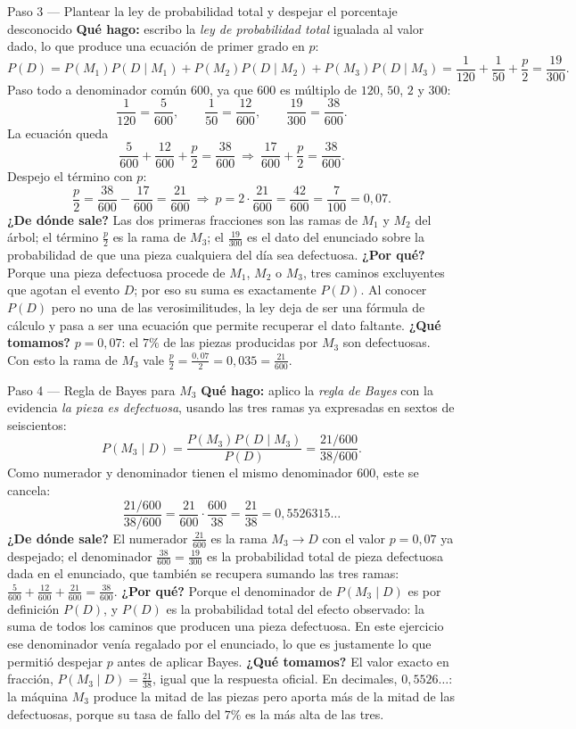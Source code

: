 \documentclass[11pt]{article}
\begin{document}
\begin{sol}
\begin{paso}{Paso 3 --- Plantear la ley de probabilidad total y despejar el porcentaje desconocido}
\textbf{Qué hago:} escribo la \emph{ley de probabilidad total} igualada al valor dado, lo que produce una ecuación de primer grado en $p$:
\[
P(D)=P(M_1)P(D\mid M_1)+P(M_2)P(D\mid M_2)+P(M_3)P(D\mid M_3)
=\frac{1}{120}+\frac{1}{50}+\frac{p}{2}=\frac{19}{300}.
\]
Paso todo a denominador común $600$, ya que $600$ es múltiplo de $120$, $50$, $2$ y $300$:
\[
\frac{1}{120}=\frac{5}{600},\qquad \frac{1}{50}=\frac{12}{600},\qquad \frac{19}{300}=\frac{38}{600}.
\]
La ecuación queda
\[
\frac{5}{600}+\frac{12}{600}+\frac{p}{2}=\frac{38}{600}\ \Longrightarrow\ \frac{17}{600}+\frac{p}{2}=\frac{38}{600}.
\]
Despejo el término con $p$:
\[
\frac{p}{2}=\frac{38}{600}-\frac{17}{600}=\frac{21}{600}\ \Longrightarrow\ p=2\cdot\frac{21}{600}=\frac{42}{600}=\frac{7}{100}=0,07 .
\]
\textbf{¿De dónde sale?} Las dos primeras fracciones son las ramas de $M_1$ y $M_2$ del árbol; el término $\tfrac{p}{2}$ es la rama de $M_3$; el $\tfrac{19}{300}$ es el dato del enunciado sobre la probabilidad de que una pieza cualquiera del día sea defectuosa.
\textbf{¿Por qué?} Porque una pieza defectuosa procede de $M_1$, $M_2$ o $M_3$, tres caminos excluyentes que agotan el evento $D$; por eso su suma es exactamente $P(D)$. Al conocer $P(D)$ pero no una de las verosimilitudes, la ley deja de ser una fórmula de cálculo y pasa a ser una ecuación que permite recuperar el dato faltante.
\textbf{¿Qué tomamos?} $p=0,07$: el $7\%$ de las piezas producidas por $M_3$ son defectuosas. Con esto la rama de $M_3$ vale $\tfrac{p}{2}=\tfrac{0,07}{2}=0,035=\tfrac{21}{600}$.
\end{paso}

\begin{paso}{Paso 4 --- Regla de Bayes para $M_3$}
\textbf{Qué hago:} aplico la \emph{regla de Bayes} con la evidencia \emph{la pieza es defectuosa}, usando las tres ramas ya expresadas en sextos de seiscientos:
\[
P(M_3\mid D)=\frac{P(M_3)P(D\mid M_3)}{P(D)}=\frac{21/600}{38/600}.
\]
Como numerador y denominador tienen el mismo denominador $600$, este se cancela:
\[
\frac{21/600}{38/600}=\frac{21}{600}\cdot\frac{600}{38}=\frac{21}{38}=0,5526315\ldots
\]
\textbf{¿De dónde sale?} El numerador $\tfrac{21}{600}$ es la rama $M_3\to D$ con el valor $p=0,07$ ya despejado; el denominador $\tfrac{38}{600}=\tfrac{19}{300}$ es la probabilidad total de pieza defectuosa dada en el enunciado, que también se recupera sumando las tres ramas: $\tfrac{5}{600}+\tfrac{12}{600}+\tfrac{21}{600}=\tfrac{38}{600}$.
\textbf{¿Por qué?} Porque el denominador de $P(M_3\mid D)$ es por definición $P(D)$, y $P(D)$ es la probabilidad total del efecto observado: la suma de todos los caminos que producen una pieza defectuosa. En este ejercicio ese denominador venía regalado por el enunciado, lo que es justamente lo que permitió despejar $p$ antes de aplicar Bayes.
\textbf{¿Qué tomamos?} El valor exacto en fracción, $P(M_3\mid D)=\tfrac{21}{38}$, igual que la respuesta oficial. En decimales, $0,5526\ldots$: la máquina $M_3$ produce la mitad de las piezas pero aporta más de la mitad de las defectuosas, porque su tasa de fallo del $7\%$ es la más alta de las tres.
\end{paso}


\end{sol}
\end{document}
